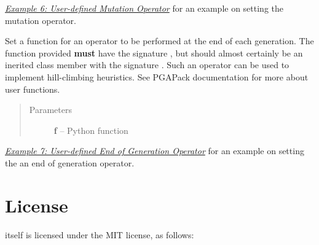 \documentclass[letterpaper,11pt,english]{sphinxmanual}
\begin{document}
\begin{fulllineitems}
\begin{fulllineitems}
\begin{quote}
\begin{description}
\end{description}\end{quote}




{\hyperref[examples:sec-mutationexamples]{\emph{Example 6: User-defined Mutation Operator}}} for an example on setting the mutation
operator.



\end{fulllineitems}


\begin{fulllineitems}
\label{api_reference:PGA.SetEndOfGen}
Set a function for an operator to be performed at the end of each
generation.  The function  provided
\textbf{must} have the signature , but should almost certainly
be an inerited class member with the signature .
Such an operator can be used to implement hill-climbing heuristics.
See PGAPack documentation for more about user functions.
\begin{quote}\begin{description}
\item[{Parameters}] \leavevmode
\textbf{f} -- Python function

\end{description}\end{quote}




{\hyperref[examples:sec-endofgenexamples]{\emph{Example 7: User-defined End of Generation Operator}}} for an example on setting the an end of
generation operator.



\end{fulllineitems}


\end{fulllineitems}



\chapter{License}
\label{license:sec-license}\label{license::doc}\label{license:license}
 itself is licensed under the MIT license, as follows:
\end{document}
